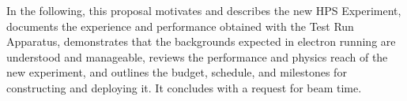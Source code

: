 In the following, this proposal motivates and describes the new HPS Experiment, documents the experience and performance obtained with the Test Run Apparatus, demonstrates that the backgrounds expected in electron running are understood and manageable,  reviews the performance and physics reach of the new experiment, and outlines the budget, schedule, and milestones for constructing  and deploying it. It concludes with a request for beam time.


